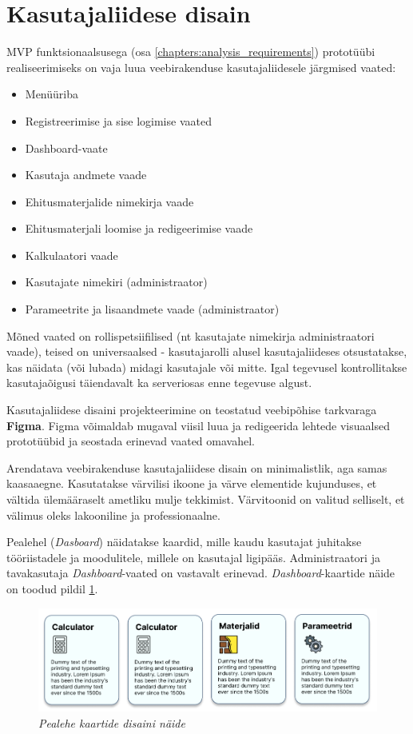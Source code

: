 \section{Kasutajaliidese disain}
\label{chapters:analysis_interface_design}
MVP funktsionaalsusega (osa \ref{chapters:analysis_requirements}) prototüübi  realiseerimiseks on vaja luua
veebirakenduse kasutajaliidesele järgmised vaated:
\begin{itemize}
    \item Menüüriba
    \item Registreerimise ja sise logimise vaated
    \item Dashboard-vaate
    \item Kasutaja andmete vaade
    \item Ehitusmaterjalide nimekirja vaade
    \item Ehitusmaterjali loomise ja redigeerimise vaade
    \item Kalkulaatori vaade
    \item Kasutajate nimekiri (administraator)
    \item Parameetrite ja lisaandmete vaade (administraator)
\end{itemize}

Mõned vaated on rollispetsiifilised (nt kasutajate nimekirja administraatori vaade), teised on universaalsed - 
kasutajarolli alusel kasutajaliideses otsustatakse, kas näidata (või lubada) midagi kasutajale või mitte.
Igal tegevusel kontrollitakse kasutajaõigusi täiendavalt ka serveriosas enne tegevuse algust.

Kasutajaliidese disaini projekteerimine on teostatud veebipõhise tarkvaraga \textbf{Figma}. Figma võimaldab 
mugaval viisil luua ja redigeerida lehtede visuaalsed prototüübid ja seostada erinevad vaated omavahel. 

Arendatava veebirakenduse kasutajaliidese disain on minimalistlik, aga samas kaasaaegne. Kasutatakse värvilisi ikoone ja värve
elementide kujunduses, et vältida ülemääraselt ametliku mulje tekkimist. Värvitoonid on valitud selliselt, et 
välimus oleks lakooniline ja professionaalne.

Pealehel (\textit{Dasboard}) näidatakse kaardid, mille kaudu kasutajat juhitakse tööriistadele ja 
moodulitele, millele on kasutajal ligipääs. Administraatori ja tavakasutaja \textit{Dashboard}-vaated
on vastavalt erinevad. \textit{Dashboard}-kaartide näide on toodud pildil \ref{fig:desing_dashboard_cards}.
\begin{figure}[ht]
    \centering
    \includegraphics[width=1\textwidth]{figures/analysis/desing_dashboard_cards.png}
    \caption[Pealehe kaartide disaini näide]{\textit{Pealehe kaartide disaini näide}}
    \label{fig:desing_dashboard_cards}
\end{figure}

